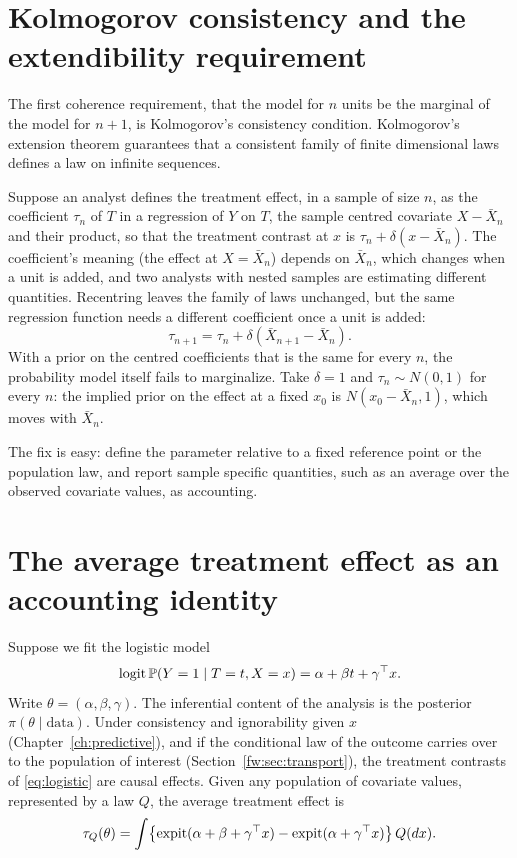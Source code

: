 \section{Kolmogorov consistency and the extendibility requirement}

The first coherence requirement, that the model for $n$ units be the marginal of the model for $n + 1$, is Kolmogorov's consistency condition. Kolmogorov's extension theorem guarantees that a consistent family of finite dimensional laws defines a law on infinite sequences.

\begin{example}
Suppose an analyst defines the treatment effect, in a sample of size $n$, as the coefficient $\tau_n$ of $T$ in a regression of $Y$ on $T$, the sample centred covariate $X - \bar X_n$ and their product, so that the treatment contrast at $x$ is $\tau_n + \delta(x - \bar X_n)$. The coefficient's meaning (the effect at $X = \bar X_n$) depends on $\bar X_n$, which changes when a unit is added, and two analysts with nested samples are estimating different quantities. Recentring leaves the family of laws unchanged, but the same regression function needs a different coefficient once a unit is added:
\[
\tau_{n+1} = \tau_n + \delta(\bar X_{n+1} - \bar X_n).
\]
With a prior on the centred coefficients that is the same for every $n$, the probability model itself fails to marginalize. Take $\delta = 1$ and $\tau_n \sim N(0, 1)$ for every $n$: the implied prior on the effect at a fixed $x_0$ is $N(x_0 - \bar X_n, 1)$, which moves with $\bar X_n$.
\end{example}

The fix is easy: define the parameter relative to a fixed reference point or the population law, and report sample specific quantities, such as an average over the observed covariate values, as accounting.

\section{The average treatment effect as an accounting identity}

Suppose we fit the logistic model
\begin{equation}
\operatorname{logit} \mathbb{P}(Y = 1 \mid T = t, X = x) = \alpha + \beta t + \gamma^\top x.
\label{eq:logistic}
\end{equation}
Write $\theta = (\alpha, \beta, \gamma)$. The inferential content of the analysis is the posterior $\pi(\theta \mid \text{data})$. Under consistency and ignorability given $x$ (Chapter~\ref{ch:predictive}), and if the conditional law of the outcome carries over to the population of interest (Section~\ref{fw:sec:transport}), the treatment contrasts of \eqref{eq:logistic} are causal effects. Given any population of covariate values, represented by a law $Q$, the average treatment effect is
\begin{equation}
\tau_Q(\theta) = \int \bigl\{ \operatorname{expit}(\alpha + \beta + \gamma^\top x) - \operatorname{expit}(\alpha + \gamma^\top x) \bigr\} \, Q(dx).
\label{eq:tauQ}
\end{equation}

